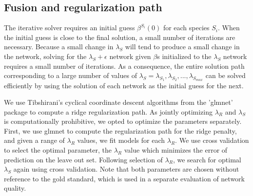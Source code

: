 \documentclass[11pt]{article}
\begin{document}
\subsection{Fusion and regularization path}
The iterative solver requires an initial guess $\beta^{S_i}(0)$ for each species $S_i$. When the initial guess is close to the final solution, a small number of iterations are necessary. Because a small change in $\lambda_S$ will tend to produce a small change in the network, solving for the $\lambda_S+\epsilon$ network given $\beta$s initialized to the $\lambda_S$ network requires a small number of iterations. As a consequence, the entire solution path corresponding to a large number of values of $\lambda_S= \lambda_S_1, \lambda_S_2, ..., \lambda_S_{max}$ can be solved efficiently by using the solution of each network as the initial guess for the next. 

We use Tibshirani's cyclical coordinate descent algorithms from the 'glmnet' package \cite{friedman_regularization_2010} to compute a ridge regularization path. As jointly optimizing $\lambda_R$ and $\lambda_S$ is computationally prohibitive, we opted to optimize the parameters separately. First, we use glmnet to compute the regularization path for the ridge penalty, and given a range of $\lambda_R$ values, we fit models for each $\lambda_R$. We use cross validation to select the optimal parameter, the $\lambda_R$ value which minimizes the error of prediction on the leave out set. Following selection of $\lambda_R$, we search for optimal $\lambda_S$ again using cross validation. Note that both parameters are chosen without reference to the gold standard, which is used in a separate evaluation of network quality. 

\end{document}

